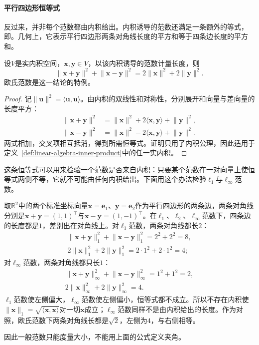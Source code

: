 \paragraph{平行四边形恒等式}
反过来，并非每个范数都由内积给出。内积诱导的范数还满足一条额外的等式，即。几何上，它表示平行四边形两条对角线长度的平方和等于四条边长度的平方和。
\begin{theorem}[平行四边形恒等式]
\label{thm:linear-algebra-parallelogram}
设$V$是实内积空间，$\bm x,\bm y\in V$，以该内积诱导的范数计量长度，则
\begin{equation}
 \lVert\bm x+\bm y\rVert^2+\lVert\bm x-\bm y\rVert^2
 =2\lVert\bm x\rVert^2+2\lVert\bm y\rVert^2.
 \label{eq:functional-parallelogram-identity}
\end{equation}
欧氏范数是这一结论的特例。
\end{theorem}
\begin{proof}
记$\lVert\bm u\rVert^2=\langle\bm u,\bm u\rangle$。由内积的双线性和对称性，分别展开和向量与差向量的长度平方：
\[
 \begin{aligned}
 \lVert\bm x+\bm y\rVert^2
 &=\lVert\bm x\rVert^2+2\langle\bm x,\bm y\rangle+\lVert\bm y\rVert^2,\\
 \lVert\bm x-\bm y\rVert^2
 &=\lVert\bm x\rVert^2-2\langle\bm x,\bm y\rangle+\lVert\bm y\rVert^2.
 \end{aligned}
\]
两式相加，交叉项相互抵消，得到所需恒等式。证明只用了内积公理，因此适用于定义~\ref{def:linear-algebra-inner-product}中的任一实内积。
\end{proof}

这条恒等式可以用来检验一个范数是否来自内积：只要某个范数在一对向量上使恒等式两侧不等，它就不可能由任何内积给出。下面用这个办法检验$\ell_1$与$\ell_\infty$范数。
\begin{example}
\label{ex:ls-l1-linf-not-inner-product}
取$\mathbb R^2$中的两个标准坐标向量$\bm x=\bm e_1$、$\bm y=\bm e_2$作为平行四边形的两条边，两条对角线分别是$\bm x+\bm y=(1,1)^\top$与$\bm x-\bm y=(1,-1)^\top$。在$\ell_1$、$\ell_2$、$\ell_\infty$范数下，四条边的长度都是$1$，差别出在对角线上。对$\ell_1$范数，两条对角线都长$2$：
\[
 \begin{gathered}
 \lVert\bm x+\bm y\rVert_1^2+\lVert\bm x-\bm y\rVert_1^2=2^2+2^2=8,\\
 2\lVert\bm x\rVert_1^2+2\lVert\bm y\rVert_1^2=2\cdot1^2+2\cdot1^2=4;
 \end{gathered}
\]
对$\ell_\infty$范数，两条对角线都只长$1$：
\[
 \begin{gathered}
 \lVert\bm x+\bm y\rVert_\infty^2+\lVert\bm x-\bm y\rVert_\infty^2=1^2+1^2=2,\\
 2\lVert\bm x\rVert_\infty^2+2\lVert\bm y\rVert_\infty^2=4.
 \end{gathered}
\]
$\ell_1$范数使左侧偏大，$\ell_\infty$范数使左侧偏小，恒等式都不成立。所以不存在内积使$\lVert\bm x\rVert_1=\sqrt{\langle\bm x,\bm x\rangle}$对一切$\bm x$成立；$\ell_\infty$范数同样不是由内积给出的长度。作为对照，欧氏范数下两条对角线长都是$\sqrt2$，左侧为$4$，与右侧相等。
\end{example}
因此一般范数只能度量大小，不能用上面的公式定义夹角。

